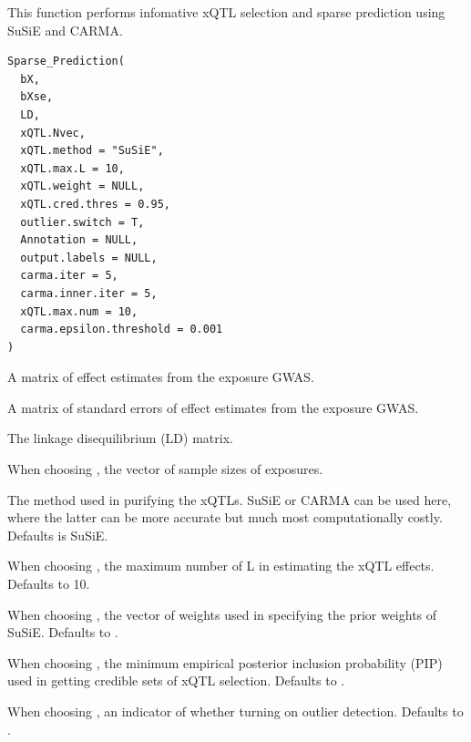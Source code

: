 \documentclass[a4paper]{book}
\begin{document}
%
\begin{Description}
This function performs infomative xQTL selection and sparse prediction using SuSiE and CARMA.
\end{Description}
%
\begin{Usage}
\begin{verbatim}
Sparse_Prediction(
  bX,
  bXse,
  LD,
  xQTL.Nvec,
  xQTL.method = "SuSiE",
  xQTL.max.L = 10,
  xQTL.weight = NULL,
  xQTL.cred.thres = 0.95,
  outlier.switch = T,
  Annotation = NULL,
  output.labels = NULL,
  carma.iter = 5,
  carma.inner.iter = 5,
  xQTL.max.num = 10,
  carma.epsilon.threshold = 0.001
)
\end{verbatim}
\end{Usage}
%
\begin{Arguments}
\begin{ldescription}
\item[\code{bX}] A matrix of effect estimates from the exposure GWAS.

\item[\code{bXse}] A matrix of standard errors of effect estimates from the exposure GWAS.

\item[\code{LD}] The linkage disequilibrium (LD) matrix.

\item[\code{xQTL.Nvec}] When choosing , the vector of sample sizes of exposures.

\item[\code{xQTL.method}] The method used in purifying the xQTLs. SuSiE or CARMA can be used here, where the latter can be more accurate but much most computationally costly. Defaults is SuSiE.

\item[\code{xQTL.max.L}] When choosing , the maximum number of L in estimating the xQTL effects. Defaults to 10.

\item[\code{xQTL.weight}] When choosing , the vector of weights used in specifying the prior weights of SuSiE. Defaults to .

\item[\code{xQTL.cred.thres}] When choosing , the minimum empirical posterior inclusion probability (PIP) used in getting credible sets of xQTL selection. Defaults to .

\item[\code{outlier.switch}] When choosing , an indicator of whether turning on outlier detection. Defaults to .


\end{ldescription}
\end{Arguments}
\end{document}

